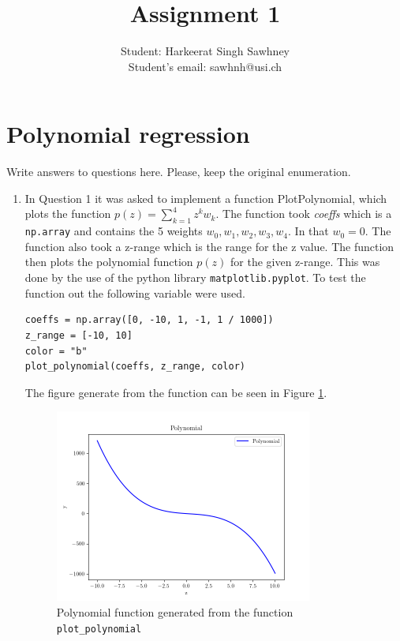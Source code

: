 \documentclass[a4paper]{article}
\title{Assignment 1}
\author{Student: Harkeerat Singh Sawhney\\Student's email: sawhnh@usi.ch } %
\date{}
\begin{document}
\maketitle

\section*{Polynomial regression}
Write answers to questions here. Please, keep the original enumeration.

\begin{enumerate}
	\item In Question 1 it was asked to implement a function PlotPolynomial, which plots the function $ p(z) = \sum_{k=1}^{4} z^k w_k $. The function took \textit{coeffs} which is a \texttt{np.array} and contains the 5 weights $ w_{0}, w_{1}, w_{2}, w_{3}, w_{4} $. In that $ w_{0} = 0 $. The function also took a z-range which is the range for the z value. The function then plots the polynomial function $ p(z) $ for the given z-range. This was done by the use of the python library \texttt{matplotlib.pyplot}. To test the function out the following variable were used.


	      \begin{lstlisting}[style=mystyle]
coeffs = np.array([0, -10, 1, -1, 1 / 1000])
z_range = [-10, 10]
color = "b"
plot_polynomial(coeffs, z_range, color)
\end{lstlisting}

	      The figure generate from the function can be seen in Figure \ref{fig:question1}.
	      \begin{figure}[H]
		      \centering
		      \includegraphics[width=0.8\textwidth]{../Graph/polynomial-question1.png}
		      \caption{Polynomial function generated from the function \texttt{plot\_polynomial}}
		      \label{fig:question1}
	      \end{figure}


\end{enumerate}
\end{document}
